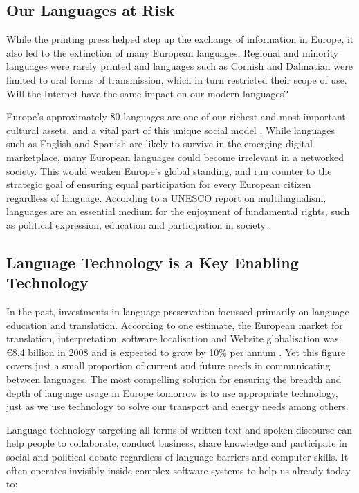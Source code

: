 \begin{multicols}{2}
\subsection{Our Languages at Risk}

While the printing press helped step up the exchange of information in Europe, it also led to the extinction of many European languages. Regional and minority languages were rarely printed and languages such as Cornish and Dalmatian were limited to oral forms of transmission, which in turn restricted their scope of use. Will the Internet have the same impact on our modern languages?


Europe’s approximately 80 languages are one of our richest and most important cultural assets, and a vital part of this unique social model \cite{EC2}. While languages such as English and Spanish are likely to survive in the emerging digital marketplace, many European languages could become irrelevant in a networked society. This would weaken Europe’s global standing, and run counter to the strategic goal of ensuring equal participation for every European citizen regardless of language. According to a UNESCO report on multilingualism, languages are an essential medium for the enjoyment of fundamental rights, such as political expression, education and participation in society \cite{Unesco1}.

\subsection{Language Technology is a Key Enabling Technology}

In the past, investments in language preservation focussed primarily on language education and translation. According to one estimate, the European market for translation, interpretation, software localisation and Website globalisation was €8.4 billion in 2008 and is expected to grow by 10\% per annum \cite{EC3}. Yet this figure covers just a small proportion of current and future needs in communicating between languages. The most compelling solution for ensuring the breadth and depth of language usage in Europe tomorrow is to use appropriate technology, just as we use technology to solve our transport and energy needs among others.

Language technology targeting all forms of written text and spoken discourse can help people to collaborate, conduct business, share knowledge and participate in social and political debate regardless of language barriers and computer skills. It often operates invisibly inside complex software systems to help us already today to:


\end{multicols}
